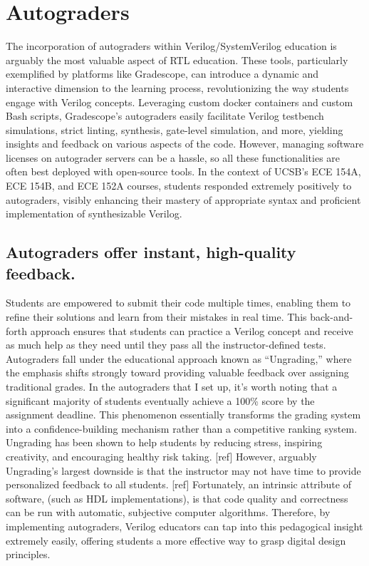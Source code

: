 
\chapter{Autograders}
\label{chapter:autograders}

The incorporation of autograders within Verilog/SystemVerilog education is arguably the most valuable aspect of RTL education. These tools, particularly exemplified by platforms like Gradescope, can introduce a dynamic and interactive dimension to the learning process, revolutionizing the way students engage with Verilog concepts. Leveraging custom docker containers and custom Bash scripts, Gradescope's autograders easily facilitate Verilog testbench simulations, strict linting, synthesis, gate-level simulation, and more, yielding insights and feedback on various aspects of the code. However, managing software licenses on autograder servers can be a hassle, so all these functionalities are often best deployed with open-source tools. In the context of UCSB's ECE 154A, ECE 154B, and ECE 152A courses, students responded extremely positively to autograders, visibly enhancing their mastery of appropriate syntax and proficient implementation of synthesizable Verilog.

\section{Autograders offer instant, high-quality feedback.}

Students are empowered to submit their code multiple times, enabling them to refine their solutions and learn from their mistakes in real time. This back-and-forth approach ensures that students can practice a Verilog concept and receive as much help as they need until they pass all the instructor-defined tests. Autograders fall under the educational approach known as ``Ungrading,'' where the emphasis shifts strongly toward providing valuable feedback over assigning traditional grades. In the autograders that I set up, it's worth noting that a significant majority of students eventually achieve a 100\% score by the assignment deadline. This phenomenon essentially transforms the grading system into a confidence-building mechanism rather than a competitive ranking system. Ungrading has been shown to help students by reducing stress, inspiring creativity, and encouraging healthy risk taking. [ref] However, arguably Ungrading's largest downside is that the instructor may not have time to provide personalized feedback to all students. [ref] Fortunately, an intrinsic attribute of software, (such as HDL implementations), is that code quality and correctness can be run with automatic, subjective computer algorithms. Therefore, by implementing autograders, Verilog educators can tap into this pedagogical insight extremely easily, offering students a more effective way to grasp digital design principles.

